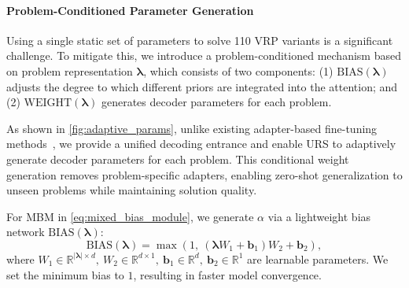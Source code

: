 \documentclass{article}
\theoremstyle{plain}
\theoremstyle{definition}
\theoremstyle{remark}
\begin{document}
\paragraph{Problem-Conditioned Parameter Generation}
Using a single static set of parameters to solve 110 VRP variants is a significant challenge. To mitigate this, we introduce a problem-conditioned mechanism based on problem representation $\bm{\lambda}$, which consists of two components: (1) $\mathrm{BIAS}(\bm{\lambda})$ adjusts the degree to which different priors are integrated into the attention; and (2) $\mathrm{WEIGHT}(\bm{\lambda})$ generates decoder parameters for each problem. 

As shown in \cref{fig:adaptive_params}, unlike existing adapter-based fine-tuning methods~\citep{lin2024cross,drakulic2025goal}, we provide a unified decoding entrance and enable URS to adaptively generate decoder parameters for each problem. This conditional weight generation removes problem-specific adapters, enabling zero-shot generalization to unseen problems while maintaining solution quality.

For MBM in \cref{eq:mixed_bias_module}, we generate $\alpha$ via a lightweight bias network $\mathrm{BIAS}(\bm{\lambda})$:
\begin{equation}
    \mathrm{BIAS}(\bm{\lambda}) = \max\left(1,\  \left(\bm{\lambda} W_1+\mathbf{b}_{1}\right)W_2 +\mathbf{b}_{2}\right),
    \label{eq:bias}
\end{equation}
where $W_1 \in \mathbb{R}^{|\bm{\lambda}|\times d},\  W_2 \in \mathbb{R}^{d\times 1},\  \mathbf{b}_1\in \mathbb{R}^{d},\  \mathbf{b}_2\in \mathbb{R}^{1}$ are learnable parameters. We set the minimum bias to $1$, resulting in faster model convergence. 
\end{document}
